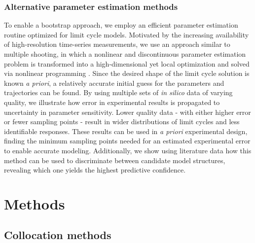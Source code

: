 \subsubsection{Alternative parameter estimation methods}

To enable a bootstrap approach, we employ an efficient parameter estimation routine optimized for limit cycle models. 
Motivated by the increasing availability of high-resolution time-series measurements, we use an approach similar to multiple shooting, in which a nonlinear and discontinuous parameter estimation problem is transformed into a high-dimensional yet local optimization and solved via nonlinear programming \cite{Biegler2010}. 
Since the desired shape of the limit cycle solution is known {\itshape a priori}, a relatively accurate initial guess for the parameters and trajectories can be found. 
By using multiple sets of {\itshape in silico} data of varying quality, we illustrate how error in experimental results is propagated to uncertainty in parameter sensitivity. 
Lower quality data - with either higher error or fewer sampling points - result in wider distributions of limit cycles and less identifiable responses. 
These results can be used in {\itshape a priori} experimental design, finding the minimum sampling points needed for an estimated experimental error to enable accurate modeling. 
Additionally, we show using literature data how this method can be used to discriminate between candidate model structures, revealing which one yields the highest predictive confidence. 

\section{Methods}\label{sec:idmethods}
\subsection{Collocation methods} \label{sec:coll}

